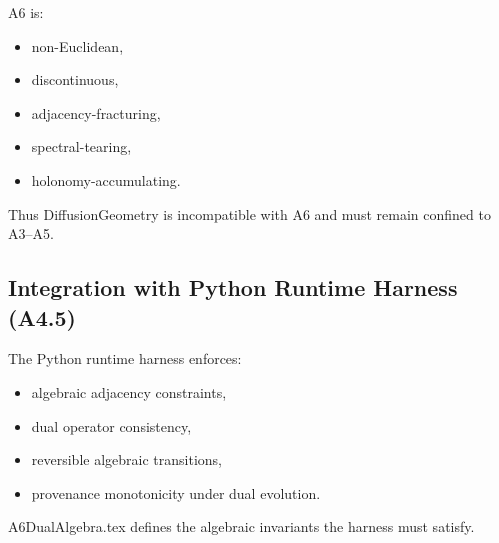 A6 is:
\begin{itemize}
  \item non-Euclidean,
  \item discontinuous,
  \item adjacency-fracturing,
  \item spectral-tearing,
  \item holonomy-accumulating.
\end{itemize}

Thus DiffusionGeometry is incompatible with A6 and must remain confined to
A3–A5.

\subsection{Integration with Python Runtime Harness (A4.5)}

The Python runtime harness enforces:
\begin{itemize}
  \item algebraic adjacency constraints,
  \item dual operator consistency,
  \item reversible algebraic transitions,
  \item provenance monotonicity under dual evolution.
\end{itemize}

A6DualAlgebra.tex defines the algebraic invariants the harness must satisfy.

